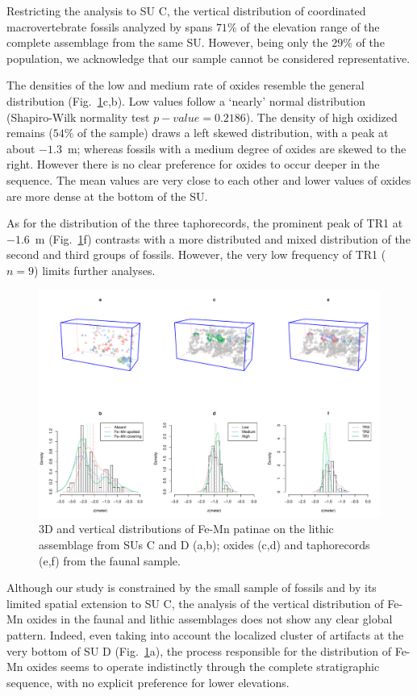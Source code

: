 \documentclass[review,authoryear]{elsarticle} %
\begin{document}
Restricting the analysis to SU C, the vertical distribution of coordinated macrovertebrate fossils analyzed by \cite{Bagnus2011} spans $71\%$ of the elevation range of the complete assemblage from the same SU. However, being only the $29\%$ of the population, we acknowledge that our sample cannot be considered representative.

The densities of the low and medium rate of oxides resemble the general distribution (Fig.~\ref{fig:4}c,b). Low values follow a ‘nearly’ normal distribution (Shapiro-Wilk normality test $p-value=0.2186$). The density of high oxidized remains ($54\%$ of the sample) draws a left skewed distribution, with a peak at about $-1.3$~m; whereas fossils with a medium degree of oxides are skewed to the right. However there is no clear preference for oxides to occur deeper in the sequence. The mean values are very close to each other and lower values of oxides are more dense at the bottom of the SU.

As for the distribution of the three taphorecords, the prominent peak of TR1 at $-1.6$~m (Fig.~\ref{fig:4}f) contrasts with a more distributed and mixed distribution of the second and third groups of fossils. However, the very low frequency of TR1 ($n=9$) limits further analyses.

\begin{figure}
  \centering
  \includegraphics[width=1\textwidth]{../artwork/Fig4.pdf}
  \caption{3D and vertical distributions of Fe-Mn patinae on the lithic assemblage from SUs C and D (a,b); oxides (c,d) and taphorecords (e,f) from the faunal sample.}
  \label{fig:4}
\end{figure}

Although our study is constrained by the small sample of fossils and by its limited spatial extension to SU C, the analysis of the vertical distribution of Fe-Mn oxides in the faunal and lithic assemblages does not show any clear global pattern. Indeed, even taking into account the localized cluster of artifacts at the very bottom of SU D (Fig.~\ref{fig:4}a), the process responsible for the distribution of Fe-Mn oxides seems to operate indistinctly through the complete stratigraphic sequence, with no explicit preference for lower elevations.
\end{document}
